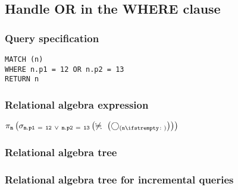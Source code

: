 
\subsection{Handle OR in the WHERE clause}

\subsubsection*{Query specification}

\begin{lstlisting}
MATCH (n)
WHERE n.p1 = 12 OR n.p2 = 13
RETURN n
\end{lstlisting}

\subsubsection*{Relational algebra expression}

$\projection{\var{n}} \left(\selection{\mathtt{n.p1~=~12~\lor~n.p2~=~13}} \left(\alldifferent{} \left(\getvertices{n}{}\right)\right)\right)$

\subsubsection*{Relational algebra tree}


\subsubsection*{Relational algebra tree for incremental queries}

